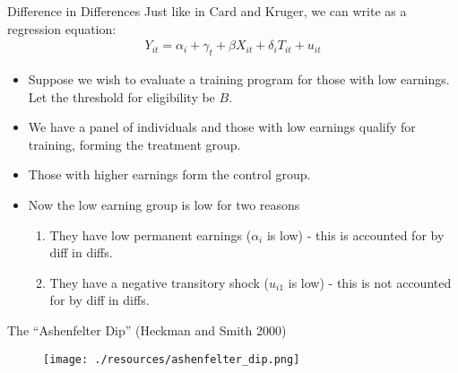 \begin{frame}{Difference in Differences}
Just like in Card and Kruger, we can write as a regression equation:
\begin{align*}
 Y_{it} =\alpha_i +\gamma_t +\beta X_{it} + \delta_i T_{it}  + u_{it}
 \end{align*}
\begin{itemize}
\item Suppose we wish to evaluate a training program for those with low
earnings. Let the threshold for eligibility be $B$.
\item We have a panel of individuals and those with low earnings qualify for
training, forming the treatment group.
\item Those with higher earnings form the control group. 
\item Now the low earning group is low for two reasons
\begin{enumerate}
\item They have low permanent earnings ($\alpha_i$ is low) - this is accounted for by diff in diffs.
\item They have a negative transitory shock ($u_{i1}$ is low) - this is not accounted for by diff in diffs.
\end{enumerate} 
\end{itemize}
\end{frame} 

\begin{frame}{The ``Ashenfelter Dip'' (Heckman and Smith 2000)}
\begin{figure}
\centering
\texttt{[image: ./resources/ashenfelter\_dip.png]}
\end{figure}
\end{frame}

